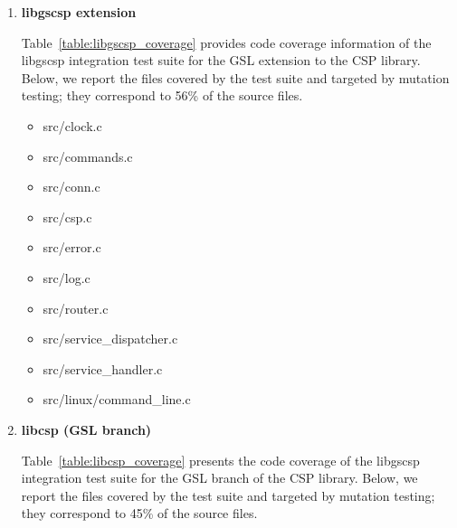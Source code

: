 \begin{enumerate}
	\item \textbf{libgscsp extension}

	Table~\ref{table:libgscsp_coverage} provides code coverage information of the libgscsp integration test suite for the GSL extension to the CSP library. Below, we report the files covered by the test suite and targeted by mutation testing; they correspond to 56\% of the source files. %
	
	\begin{itemize}
	 	\item src/clock.c
	 	\item src/commands.c
	 	\item src/conn.c
	 	\item src/csp.c
	 	\item src/error.c
	 	\item src/log.c
	 	\item src/router.c
	 	\item src/service\_dispatcher.c
	 	\item src/service\_handler.c
	 	\item src/linux/command\_line.c

	 \end{itemize} 

	\item \textbf{libcsp (GSL branch)}

	Table~\ref{table:libcsp_coverage} presents the code coverage of the libgscsp integration test suite for the GSL branch of the CSP library. 
Below, we report the files covered by the test suite and targeted by mutation testing; they correspond to 45\% of the source files. %


\end{enumerate}
